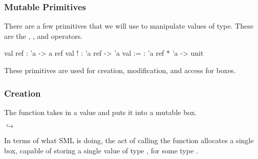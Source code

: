 \documentclass[aspectratio=169, handout]{beamer}
\begin{document}
\begin{frame}[fragile]
  \frametitle{Mutable Primitives}

  There are a few primitives that we will use to manipulate values of 
  type. These are the , \code{!}, and \code{:=} operators.

  \pause
  \vspace{\fill}

  \begin{codeblock}
    val ref : 'a -> a ref
    val !   : 'a ref -> 'a
    val :=  : 'a ref * 'a -> unit
  \end{codeblock}

  \pause
  \vspace{\fill}

  These primitives are used for creation, modification, and access for 
  boxes.
\end{frame}

\begin{frame}[fragile]
  \frametitle{ Creation}

  The  function takes in a value and puts it into a mutable box.

  \pause
  \vspace{\fill}

  \begin{center}
    \begin{minipage}{0.15\textwidth}
      \centering
    \end{minipage}
    \pause
    \begin{minipage}{0.1\textwidth}
      \centering
      $\hookrightarrow$
    \end{minipage}
    \begin{minipage}{0.15\textwidth}
      \centering
    \end{minipage}
  \end{center}

  \pause
  \vspace{\fill}


  \pause
  \vspace{\fill}

  In terms of what SML is doing, the act of calling the  function
  allocates a single box, capable of storing a single value of type ,
  for some type .

  \pause
  \vspace{\fill}

\end{frame}
\end{document}
